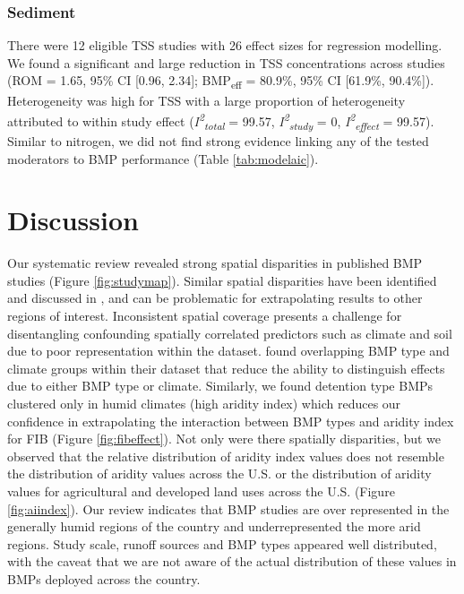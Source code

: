 \documentclass[utf8]{FrontiersinHarvard}
\begin{document}
\hypertarget{sediment}{%
\subsubsection{Sediment}\label{sediment}}

There were 12 eligible TSS studies with 26 effect sizes for regression modelling.
We found a significant and large reduction in TSS concentrations across studies (ROM = 1.65, 95\% CI {[}0.96, 2.34{]}; BMP\textsubscript{eff} = 80.9\%, 95\% CI {[}61.9\%, 90.4\%{]}).
Heterogeneity was high for TSS with a large proportion of heterogeneity attributed to within study effect (\textit{I\textsuperscript{2}\textsubscript{total}} = 99.57, \textit{I\textsuperscript{2}\textsubscript{study}} = 0, \textit{I\textsuperscript{2}\textsubscript{effect}} = 99.57).
Similar to nitrogen, we did not find strong evidence linking any of the tested moderators to BMP performance (Table \ref{tab:modelaic}).

\hypertarget{discussion}{%
\section{Discussion}\label{discussion}}

Our systematic review revealed strong spatial disparities in published BMP studies (Figure \ref{fig:studymap}).
Similar spatial disparities have been identified and discussed in \citet{kochNitrogenRemovalStormwater2014}, \citet{grudzinskiDoesRiparianFencing2020} and can be problematic for extrapolating results to other regions of interest.
Inconsistent spatial coverage presents a challenge for disentangling confounding spatially correlated predictors such as climate and soil due to poor representation within the dataset.
\citet{horvathEffectsRegionalClimate2023} found overlapping BMP type and climate groups within their dataset that reduce the ability to distinguish effects due to either BMP type or climate.
Similarly, we found detention type BMPs clustered only in humid climates (high aridity index) which reduces our confidence in extrapolating the interaction between BMP types and aridity index for FIB (Figure \ref{fig:fibeffect}).
Not only were there spatially disparities, but we observed that the relative distribution of aridity index values does not resemble the distribution of aridity values across the U.S. or the distribution of aridity values for agricultural and developed land uses across the U.S. (Figure \ref{fig:aiindex}).
Our review indicates that BMP studies are over represented in the generally humid regions of the country and underrepresented the more arid regions.
Study scale, runoff sources and BMP types appeared well distributed, with the caveat that we are not aware of the actual distribution of these values in BMPs deployed across the country.
\end{document}

